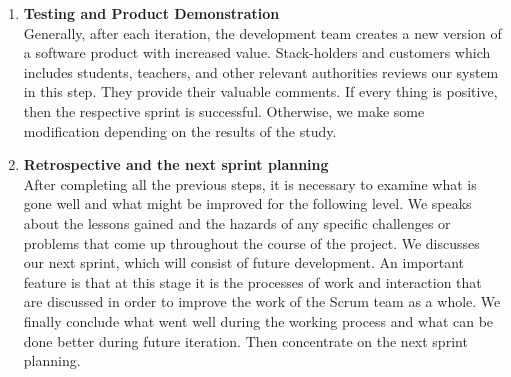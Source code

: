 \begin{enumerate}

\item \textbf{Testing and Product Demonstration}\\
Generally, after each iteration, the development team creates a new version of a software product with increased value. Stack-holders and customers which includes students, teachers, and other relevant authorities reviews our system in this step. They provide their valuable comments. If every thing is positive, then the respective sprint is successful. Otherwise, we make some modification depending on the results of the study.

\item \textbf{Retrospective and the next sprint planning}\\
After completing all the previous steps, it is necessary to examine what is gone well and what might be improved for the following level. We speaks about the lessons gained and the hazards of any specific challenges or problems that come up throughout the course of the project. We discusses our next sprint, which will consist of future development. An important feature is that at this stage it is the processes of work and interaction that are discussed in order to improve the work of the Scrum team as a whole. We finally conclude what went well during the working process and what can be done better during future iteration. Then concentrate on the next sprint planning.

\end{enumerate}


\clearpage